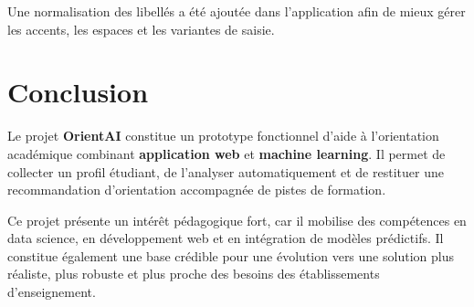 \documentclass[12pt,a4paper]{report}
\begin{document}
Une normalisation des libellés a été ajoutée dans l'application afin de mieux gérer les accents, les espaces et les variantes de saisie.

\chapter{Conclusion}

Le projet \textbf{OrientAI} constitue un prototype fonctionnel d'aide à l'orientation académique combinant \textbf{application web} et \textbf{machine learning}. Il permet de collecter un profil étudiant, de l'analyser automatiquement et de restituer une recommandation d'orientation accompagnée de pistes de formation.

Ce projet présente un intérêt pédagogique fort, car il mobilise des compétences en data science, en développement web et en intégration de modèles prédictifs. Il constitue également une base crédible pour une évolution vers une solution plus réaliste, plus robuste et plus proche des besoins des établissements d'enseignement.
\end{document}
